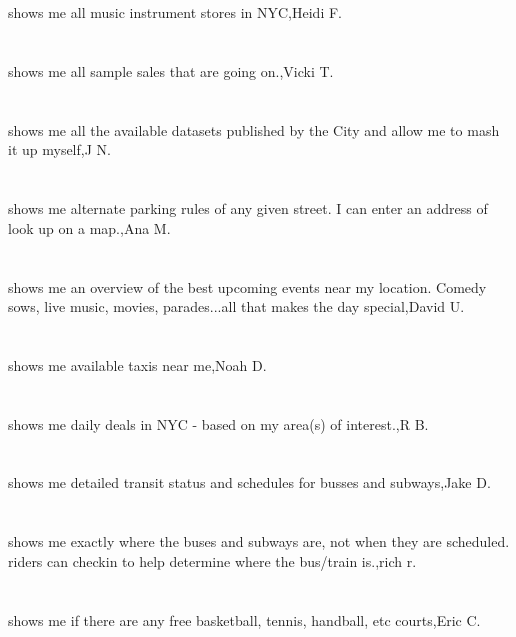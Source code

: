 \section{}shows me all music instrument stores in NYC,Heidi F.
\section{}shows me all sample sales that are going on.,Vicki T.
\section{}shows me all the available datasets published by the City and allow me to mash it up myself,J N.
\section{}shows me alternate parking rules of any given street. I can enter an address of look up on a map.,Ana M.
\section{}shows me an overview of the best upcoming events near my location. Comedy sows, live music, movies, parades...all that makes the day special,David U.
\section{}shows me available taxis near me,Noah D.
\section{}shows me daily deals in NYC - based on my area(s) of interest.,R B.
\section{}shows me detailed transit status and schedules for busses and subways,Jake D.
\section{}shows me exactly where the buses and subways are, not when they are scheduled. riders can checkin to help determine where the bus/train is.,rich r.
\section{} shows me if there are any free basketball, tennis, handball, etc courts,Eric C.
